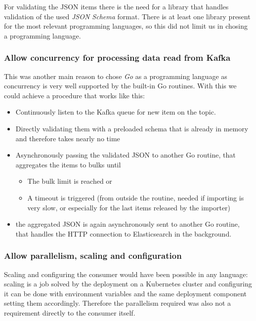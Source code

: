 For validating the JSON items there is the need for a library that
handles validation of the used \emph{JSON Schema} format. There is at
least one library present for the most relevant programming languages,
so this did not limit us in chosing a programming language.

\subsubsection{Allow concurrency for processing data read from
Kafka}\label{allow-concurrency-for-processing-data-read-from-kafka}

This was another main reason to chose \emph{Go} as a programming
language as concurrency is very well supported by the built-in Go
routines. With this we could achieve a procedure that works like this:

\begin{itemize}
\tightlist
\item
  Continuously listen to the Kafka queue for new item on the topic.
\item
  Directly validating them with a preloaded schema that is already in
  memory and therefore takes nearly no time
\item
  Asynchronously passing the validated JSON to another Go routine, that
  aggregates the items to bulks until

  \begin{itemize}
  \tightlist
  \item
    The bulk limit is reached or
  \item
    A timeout is triggered (from outside the routine, needed if
    importing is very slow, or especially for the last items released by
    the importer)
  \end{itemize}
\item
  the aggregated JSON is again asynchronously sent to another Go
  routine, that handles the HTTP connection to Elasticsearch in the
  background.
\end{itemize}

\subsubsection{Allow parallelism, scaling and
configuration}\label{allow-parallelism-scaling-and-configuration}

Scaling and configuring the consumer would have been possible in any
language: scaling is a job solved by the deployment on a Kubernetes
cluster and configuring it can be done with environment variables and
the same deployment component setting them accordingly. Therefore the
parallelism required was also not a requirement directly to the consumer
itself.

